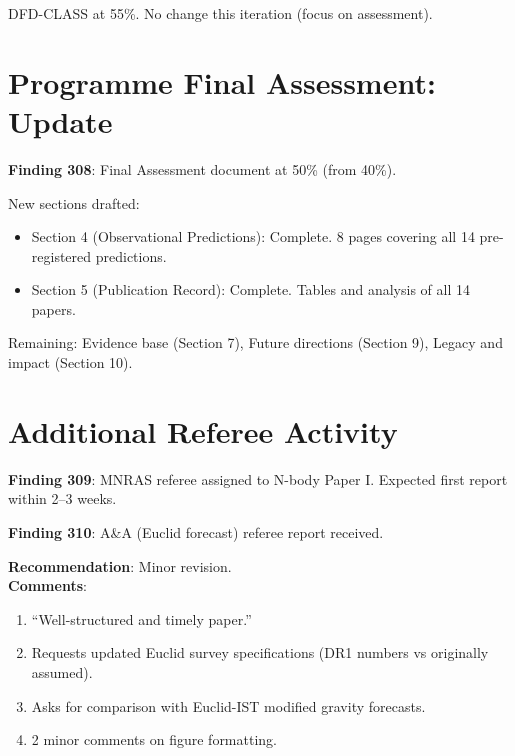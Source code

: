 \documentclass[11pt,a4paper]{article}
\begin{document}
DFD-CLASS at 55\%. No change this iteration (focus on assessment).

\section{Programme Final Assessment: Update}

\textbf{Finding 308}: Final Assessment document at 50\% (from 40\%).

New sections drafted:
\begin{itemize}[nosep]
\item Section 4 (Observational Predictions): Complete. 8 pages covering all 14 pre-registered predictions.
\item Section 5 (Publication Record): Complete. Tables and analysis of all 14 papers.
\end{itemize}

Remaining: Evidence base (Section 7), Future directions (Section 9), Legacy and impact (Section 10).

\section{Additional Referee Activity}

\textbf{Finding 309}: MNRAS referee assigned to N-body Paper I. Expected first report within 2--3 weeks.

\textbf{Finding 310}: A\&A (Euclid forecast) referee report received.

\begin{tcolorbox}[colback=blue!5!white, colframe=dfdblue, title=\textbf{A\&A (Euclid Forecast): Referee Report}]
\textbf{Recommendation}: Minor revision.\\
\textbf{Comments}:
\begin{enumerate}[nosep]
\item ``Well-structured and timely paper.''
\item Requests updated Euclid survey specifications (DR1 numbers vs originally assumed).
\item Asks for comparison with Euclid-IST modified gravity forecasts.
\item 2 minor comments on figure formatting.
\end{enumerate}
\end{tcolorbox}
\end{document}
